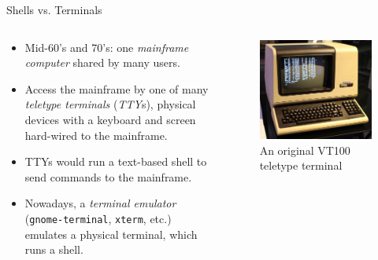 \documentclass[11pt]{beamer}
\begin{document}
\begin{frame}{Shells vs. Terminals}
	\begin{columns}
		\begin{column}{0.6\textwidth}
			\begin{itemize}
				\item Mid-60's and 70's: one \textit{mainframe computer} shared by many users.
				\item Access the mainframe by one of many \textit{teletype terminals} (\textit{TTY}s), physical devices with a keyboard and screen hard-wired to the mainframe.
				\item TTYs would run a text-based shell to send commands to the mainframe.
				\item Nowadays, a \textit{terminal emulator} (\texttt{gnome-terminal}, \texttt{xterm}, etc.) emulates a physical terminal, which runs a shell.
			\end{itemize}
		\end{column}
		\begin{column}{0.4\textwidth}
			\vspace{-10mm}
			\begin{figure}
				\includegraphics[scale=0.2]{vt100.png}
				\caption{An original VT100 teletype terminal}
			\end{figure}
		\end{column}
	\end{columns}
\end{frame}
\end{document}
